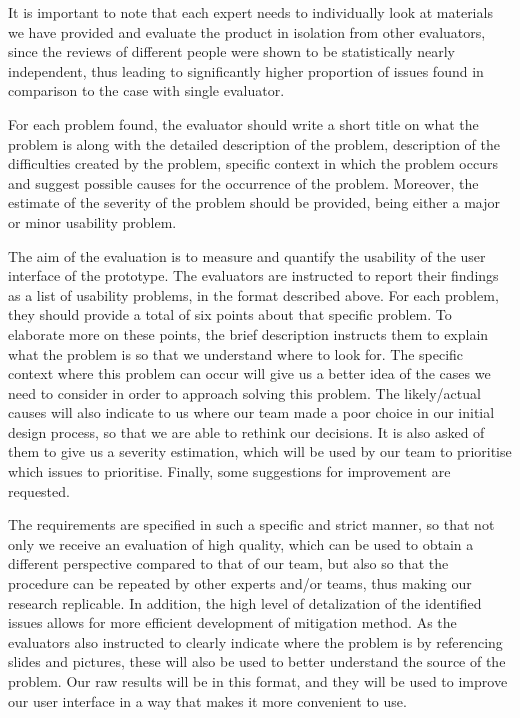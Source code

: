 It is important to note that each expert needs to individually look at materials we have provided and evaluate the product in isolation from other evaluators, since the reviews of different people were shown to be statistically nearly independent, thus leading to significantly higher proportion of issues found in comparison to the case with single evaluator\cite{nielsen92}. 

For each problem found, the evaluator should write a short title on what the problem is along with the detailed description of the problem, description of the difficulties created by the problem, specific context in which the problem occurs and suggest possible causes for the occurrence of the problem. Moreover, the estimate of the severity of the problem should be provided, being either a major or minor usability problem.

	The aim of the evaluation is to measure and quantify the usability of the user interface of the prototype. The evaluators are instructed to report their findings as a list of usability problems, in the format described above. For each problem, they should provide a total of six points about that specific problem. To elaborate more on these points, the brief description instructs them to explain what the problem is so that we understand where to look for. The specific context where this problem can occur will give us a better idea of the cases we need to consider in order to approach solving this problem. The likely/actual causes will also indicate to us where our team made a poor choice in our initial design process, so that we are able to rethink our decisions. It is also asked of them to give us a severity estimation, which will be used by our team to prioritise which issues to prioritise. Finally, some suggestions for improvement are requested.

    The requirements are specified in such a specific and strict manner, so that not only we receive an evaluation of high quality, which can be used to obtain a different perspective compared to that of our team, but also so that the procedure can be repeated by other experts and/or teams, thus making our research replicable. In addition, the high level of detalization of the identified issues allows for more efficient development of mitigation method. As the evaluators also instructed to clearly indicate where the problem is by referencing slides and pictures, these will also be used to better understand the source of the problem. Our raw results will be in this format, and they will be used to improve our user interface in a way that makes it more convenient to use.
